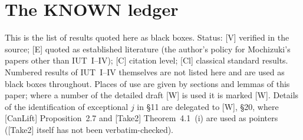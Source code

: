 \documentclass[11pt]{article}
\begin{document}
\section{The KNOWN ledger}

This is the list of results quoted here as black boxes.  Status:
[V] verified in the source; [E] quoted as established literature
(the author's policy for Mochizuki's papers other than IUT~I--IV);
[C] citation level; [Cl] classical standard results.  Numbered
results of IUT~I--IV themselves are not listed here and are used as
black boxes throughout.  Places of use are given by sections and
lemmas of this paper; where a number of the detailed draft [W] is
used it is marked [W].  Details of the identification of
exceptional $j$ in \S11 are delegated to [W], \S20, where
[CanLift] Proposition~2.7 and [Take2] Theorem~4.1~(i) are used as
pointers ([Take2] itself has not been verbatim-checked).
\end{document}
